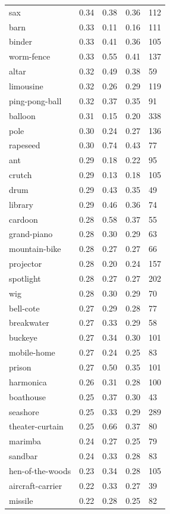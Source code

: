 \begin{center}
\begin{longtable}{lllll}
sax & 0.34 & 0.38 & 0.36 & 112 \\
barn & 0.33 & 0.11 & 0.16 & 111 \\
binder & 0.33 & 0.41 & 0.36 & 105 \\
worm-fence & 0.33 & 0.55 & 0.41 & 137 \\
altar & 0.32 & 0.49 & 0.38 & 59 \\
limousine & 0.32 & 0.26 & 0.29 & 119 \\
ping-pong-ball & 0.32 & 0.37 & 0.35 & 91 \\
balloon & 0.31 & 0.15 & 0.20 & 338 \\
pole & 0.30 & 0.24 & 0.27 & 136 \\
rapeseed & 0.30 & 0.74 & 0.43 & 77 \\
ant & 0.29 & 0.18 & 0.22 & 95 \\
crutch & 0.29 & 0.13 & 0.18 & 105 \\
drum & 0.29 & 0.43 & 0.35 & 49 \\
library & 0.29 & 0.46 & 0.36 & 74 \\
cardoon & 0.28 & 0.58 & 0.37 & 55 \\
grand-piano & 0.28 & 0.30 & 0.29 & 63 \\
mountain-bike & 0.28 & 0.27 & 0.27 & 66 \\
projector & 0.28 & 0.20 & 0.24 & 157 \\
spotlight & 0.28 & 0.27 & 0.27 & 202 \\
wig & 0.28 & 0.30 & 0.29 & 70 \\
bell-cote & 0.27 & 0.29 & 0.28 & 77 \\
breakwater & 0.27 & 0.33 & 0.29 & 58 \\
buckeye & 0.27 & 0.34 & 0.30 & 101 \\
mobile-home & 0.27 & 0.24 & 0.25 & 83 \\
prison & 0.27 & 0.50 & 0.35 & 101 \\
harmonica & 0.26 & 0.31 & 0.28 & 100 \\
boathouse & 0.25 & 0.37 & 0.30 & 43 \\
seashore & 0.25 & 0.33 & 0.29 & 289 \\
theater-curtain & 0.25 & 0.66 & 0.37 & 80 \\
marimba & 0.24 & 0.27 & 0.25 & 79 \\
sandbar & 0.24 & 0.33 & 0.28 & 83 \\
hen-of-the-woods & 0.23 & 0.34 & 0.28 & 105 \\
aircraft-carrier & 0.22 & 0.33 & 0.27 & 39 \\
missile & 0.22 & 0.28 & 0.25 & 82 \\

\end{longtable}
\end{center}
